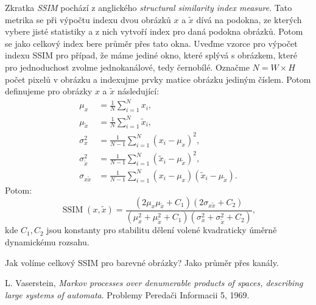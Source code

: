 \documentclass[czech]{article}
\begin{document}
Zkratka \emph{SSIM} pochází z anglického \emph{structural similarity index measure}.
Tato metrika se při výpočtu indexu dvou obrázků $x$ a $\tilde{x}$ dívá na podokna,
ze kterých vybere jisté statistiky a z nich vytvoří index pro daná podokna obrázků.
Potom se jako celkový index bere průměr přes tato okna.
Uveďme vzorce pro výpočet indexu SSIM pro případ, že máme jediné okno, které splývá s obrázkem,
které pro jednoduchost zvolme jednokanálové, tedy černobílé.
Označme $N = W \times H$ počet pixelů v obrázku a indexujme prvky matice obrázku jediným číslem.
Potom definujeme pro obrázky $x$ a $\tilde{x}$ následující:
\begin{align*}
    \mu_x &= \frac{1}{N} \sum_{i = 1}^N x_i, \\
    \mu_{\tilde{x}} &= \frac{1}{N} \sum_{i = 1}^N \tilde{x}_i, \\
    \sigma_x^2 &= \frac{1}{N - 1} \sum_{i = 1}^N (x_i - \mu_x)^2, \\
    \sigma_{\tilde{x}}^2 &= \frac{1}{N - 1} \sum_{i = 1}^N (\tilde{x}_i - \mu_{\tilde{x}})^2, \\
    \sigma_{x \tilde{x}} &= \frac{1}{N - 1} \sum_{i = 1}^N (x_i - \mu_x)(\tilde{x}_i - \mu_{\tilde{x}}).
\end{align*}
Potom:
\begin{equation}
    \operatorname{SSIM}(x, \tilde{x}) = \frac{(2 \mu_x \mu_{\tilde{x}} + C_1)(2 \sigma_{x \tilde{x}} + C_2)}{(\mu_x^2 + \mu_{\tilde{x}}^2 + C_1)(\sigma_x^2 + \sigma_{\tilde{x}}^2 + C_2)},
\end{equation}
kde $C_1, C_2$ jsou konstanty pro stabilitu dělení volené kvadraticky úměrně dynamickému rozsahu.


Jak volíme celkový SSIM pro barevné obrázky?
Jako průměr přes kanály.

\begin{thebibliography}{1}

 L. Vaserstein,
\emph{Markov processes over denumerable products of spaces, describing large systems of automata}.
Problemy Peredači Informacii 5, 1969.

\end{thebibliography}
\end{document}
